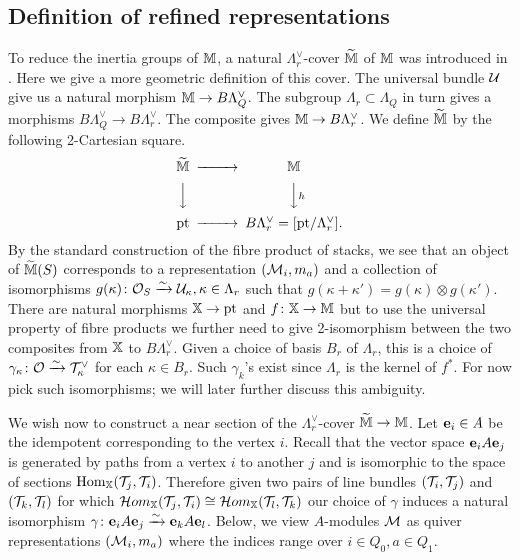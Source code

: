 \documentclass[12pt]{amsart}
\begin{document}
\subsection{Definition of refined representations}
To reduce the inertia groups of $\mathbb{M}$, a natural $\Lambda_r^{\vee}$-cover $\widetilde{\mathbb{M}}$ of $\mathbb{M}$ was introduced in \cite[Definition~3.2]{Abd}.
Here we give a more geometric definition of this cover. 
The universal bundle $\mathcal{U}$ give us a natural morphism $\mathbb{M} \rightarrow B\Lambda_Q^\vee$.
The subgroup $\Lambda_r \subset \Lambda_{Q}$ in turn gives a morphisms $B\Lambda_{Q}^\vee \rightarrow B\Lambda_r^\vee$.
The composite gives $\mathbb{M} \rightarrow B\Lambda_r^\vee$.
We define $\widetilde{\mathbb{M}}$ by the following 2-Cartesian square.
\begin{equation*}
\begin{CD}
\widetilde{\bM} @>>> \bM \\
@VVV @VVhV \\
\text{pt} @>>> B\Lambda_r^{\vee} = [\text{pt}/\Lambda_r^{\vee}].
\end{CD}
\end{equation*}
By the standard construction of the fibre product of stacks, we see that an object of $\widetilde{\mathbb{M}}(S)$ corresponds to a representation $(\mathcal{M}_i,m_a)$ and a collection of isomorphisms $g(\kappa) \colon \mathcal{O}_S \xrightarrow{\sim} \mathcal{U}_{\kappa}, \kappa \in \Lambda_r$ such that $g(\kappa + \kappa') = g(\kappa) \otimes g(\kappa')$.
There are natural morphisms $\mathbb{X} \rightarrow \text{pt}$ and $f \colon \mathbb{X} \rightarrow \mathbb{M}$ but to use the universal property of fibre products we further need to give 2-isomorphism between the two composites from $\mathbb{X}$ to $B\Lambda_r^{\vee}$.
Given a choice of basis $B_r$ of $\Lambda_r$, this is a choice of $\gamma_{\kappa} \colon \mathcal{O} \xrightarrow{\sim} \mathcal{T}_{\kappa}^\vee$ for each $\kappa \in B_r$.
Such $\gamma_k$'s exist since $\Lambda_r$ is the kernel of $f^*$.
For now pick such isomorphisms; we will later further discuss this ambiguity.

We wish now to construct a near section of the $\Lambda_r^{\vee}$-cover $\widetilde{\mathbb{M}} \rightarrow \mathbb{M}$.
Let $\mathbf{e}_i \in A$ be the idempotent corresponding to the vertex $i$. 
Recall that the vector space $\mathbf{e}_i A \mathbf{e}_j$ is generated by paths from a vertex $i$ to another $j$ and is isomorphic to the space of sections $\operatorname{Hom}_{\mathbb{X}} (\mathcal{T}_j, \mathcal{T}_i)$. 
Therefore given two pairs of line bundles $(\mathcal{T}_i, \mathcal{T}_j)$ and $(\mathcal{T}_k, \mathcal{T}_l)$ for which $\mathop{{\mathcal{H}}om}\nolimits_{\mathbb{X}}(\mathcal{T}_j, \mathcal{T}_i) \cong \mathop{{\mathcal{H}}om}\nolimits_{\mathbb{X}}(\mathcal{T}_l, \mathcal{T}_k)$ our choice of $\gamma$ induces a natural isomorphism $\gamma \colon \mathbf{e}_i A \mathbf{e}_j \xrightarrow{\sim} \mathbf{e}_k A \mathbf{e}_l$.
Below, we view $A$-modules $\mathcal{M}$ as quiver representations $(\mathcal{M}_i,m_a)$ where the indices range over $i \in Q_0, a \in Q_1$. 
\end{document}
